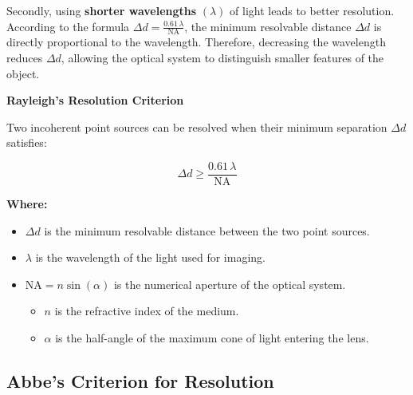 \documentclass[
  a4paper,
]{book}
\providecommand{\tightlist}{%
  \setlength{\itemsep}{0pt}\setlength{\parskip}{0pt}}
\begin{document}
Secondly, using \textbf{shorter wavelengths} \((\lambda)\) of light
leads to better resolution. According to the formula
\(\Delta d = \frac{0.61\, \lambda}{\text{NA}}\), the minimum resolvable
distance \(\Delta d\) is directly proportional to the wavelength.
Therefore, decreasing the wavelength reduces \(\Delta d\), allowing the
optical system to distinguish smaller features of the object.

\begin{tcolorbox}[enhanced jigsaw, coltitle=black, title=\textcolor{quarto-callout-note-color}{\faInfo}\hspace{0.5em}{Note}, colframe=quarto-callout-note-color-frame, toprule=.15mm, opacitybacktitle=0.6, left=2mm, opacityback=0, breakable, toptitle=1mm, bottomtitle=1mm, leftrule=.75mm, arc=.35mm, titlerule=0mm, colbacktitle=quarto-callout-note-color!10!white, rightrule=.15mm, bottomrule=.15mm, colback=white]

\textbf{Rayleigh's Resolution Criterion}

Two incoherent point sources can be resolved when their minimum
separation \(\Delta d\) satisfies:

\[
\Delta d \geq \frac{0.61\, \lambda}{\text{NA}}
\]

\textbf{Where:}

\begin{itemize}
\tightlist
\item
  \(\Delta d\) is the minimum resolvable distance between the two point
  sources.
\item
  \(\lambda\) is the wavelength of the light used for imaging.
\item
  \(\text{NA} = n \sin(\alpha)\) is the numerical aperture of the
  optical system.

  \begin{itemize}
  \tightlist
  \item
    \(n\) is the refractive index of the medium.
  \item
    \(\alpha\) is the half-angle of the maximum cone of light entering
    the lens.
  \end{itemize}
\end{itemize}

\end{tcolorbox}

\subsection{Abbe's Criterion for
Resolution}\label{abbes-criterion-for-resolution}
\end{document}

